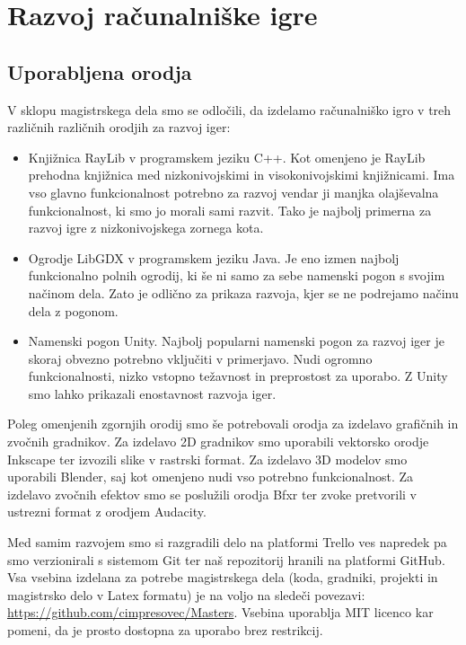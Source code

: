 \documentclass[12pt,a4paper,twoside]{book}
\begin{document}
\chapter{Razvoj računalniške igre}\thispagestyle{fancy}
\label{chapter:razvojIger}
\section{Uporabljena orodja}
V sklopu magistrskega dela smo se odločili, da izdelamo računalniško igro v treh različnih različnih orodjih za razvoj iger:
\begin{itemize}
	\item Knjižnica RayLib v programskem jeziku C++. Kot omenjeno je RayLib prehodna knjižnica med nizkonivojskimi in visokonivojskimi knjižnicami. Ima vso glavno funkcionalnost potrebno za razvoj vendar ji manjka olajševalna funkcionalnost, ki smo jo morali sami razvit. Tako je najbolj primerna za razvoj igre z nizkonivojskega zornega kota.
	\item Ogrodje LibGDX v programskem jeziku Java. Je eno izmen najbolj funkcionalno polnih ogrodij, ki še ni samo za sebe namenski pogon s svojim načinom dela. Zato je odlično za prikaza razvoja, kjer se ne podrejamo načinu dela z pogonom.
	\item Namenski pogon Unity. Najbolj popularni namenski pogon za razvoj iger je skoraj obvezno potrebno vključiti v primerjavo. Nudi ogromno funkcionalnosti, nizko vstopno težavnost in preprostost za uporabo. Z Unity smo lahko prikazali enostavnost razvoja iger.
\end{itemize}

Poleg omenjenih zgornjih orodij smo še potrebovali orodja za izdelavo grafičnih in zvočnih gradnikov. Za izdelavo 2D gradnikov smo uporabili vektorsko orodje Inkscape ter izvozili slike v rastrski format. Za izdelavo 3D modelov smo uporabili Blender, saj kot omenjeno nudi vso potrebno funkcionalnost. Za izdelavo zvočnih efektov smo se poslužili orodja Bfxr ter zvoke pretvorili v ustrezni format z orodjem Audacity.

Med samim razvojem smo si razgradili delo na platformi Trello ves napredek pa smo verzionirali s sistemom Git ter naš repozitorij hranili na platformi GitHub. Vsa vsebina izdelana za potrebe magistrskega dela (koda, gradniki, projekti in magistrsko delo v Latex formatu) je na voljo na sledeči povezavi: \url{https://github.com/cimpresovec/Masters}. Vsebina uporablja MIT licenco kar pomeni, da je prosto dostopna za uporabo brez restrikcij.
\end{document}
